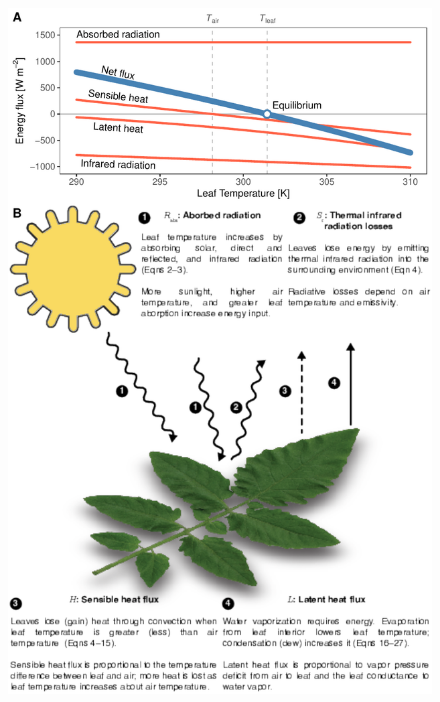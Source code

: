 \documentclass[11pt, oneside]{article}
\begin{document}
\begin{figure}[ht]
\centerline{\includegraphics[height=\textheight,keepaspectratio]{../figures/fig1.pdf}}
\end{figure}
\end{document}
